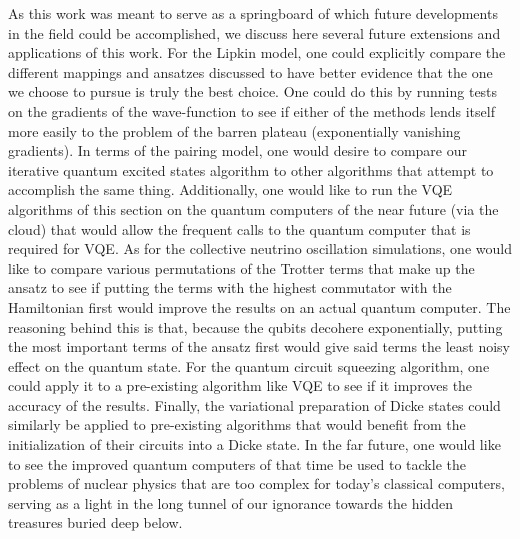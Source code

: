 \documentclass[10pt]{article}
\begin{document}
As this work was meant to serve as a springboard of which future developments in the field could be accomplished, we discuss here several future extensions and applications of this work. For the Lipkin model, one could explicitly compare the different mappings and ansatzes discussed to have better evidence that the one we choose to pursue is truly the best choice. One could do this by running tests on the gradients of the wave-function to see if either of the methods lends itself more easily to the problem of the barren plateau (exponentially vanishing gradients). In terms of the pairing model, one would desire to compare our iterative quantum excited states algorithm to other algorithms that attempt to accomplish the same thing. Additionally, one would like to run the VQE algorithms of this section on the quantum computers of the near future (via the cloud) that would allow the frequent calls to the quantum computer that is required for VQE. As for the collective neutrino oscillation simulations, one would like to compare various permutations of the Trotter terms that make up the ansatz to see if putting the terms with the highest commutator with the Hamiltonian first would improve the results on an actual quantum computer. The reasoning behind this is that, because the qubits decohere exponentially, putting the most important terms of the ansatz first would give said terms the least noisy effect on the quantum state. For the quantum circuit squeezing algorithm, one could apply it to a pre-existing algorithm like VQE to see if it improves the accuracy of the results. Finally, the variational preparation of Dicke states could similarly be applied to pre-existing algorithms that would benefit from the initialization of their circuits into a Dicke state. In the far future, one would like to see the improved quantum computers of that time be used to tackle the problems of nuclear physics that are too complex for today's classical computers, serving as a light in the long tunnel of our ignorance towards the hidden treasures buried deep below.
\end{document}
